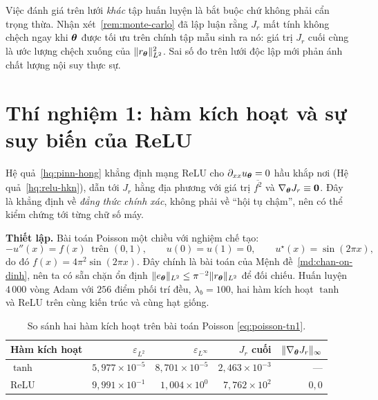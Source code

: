 Việc đánh giá trên lưới \emph{khác} tập huấn luyện là bắt buộc chứ không phải cẩn
trọng thừa. Nhận xét~\ref{rem:monte-carlo} đã lập luận rằng $J_r$ mất tính không
chệch ngay khi $\bm{\theta}$ được tối ưu trên chính tập mẫu sinh ra nó: giá trị $J_r$
cuối cùng là ước lượng chệch xuống của $\lVert r_{\bm{\theta}}\rVert^2_{L^2}$. Sai số đo
trên lưới độc lập mới phản ánh chất lượng nội suy thực sự.
 
\section{Thí nghiệm 1: hàm kích hoạt và sự suy biến của ReLU}
\label{sec:tn1}
 
\begin{thinghiem}
\label{tn:relu}
Hệ quả~\ref{hq:pinn-hong} khẳng định mạng ReLU cho
$\partial_{xx}u_{\bm{\theta}} = 0$ hầu khắp nơi
(Hệ quả~\ref{hq:relu-hkn}), dẫn tới $J_r$ hằng địa phương với giá trị
$\overline{f^2}$ và $\nabla_{\bm{\theta}}J_r \equiv \bm{0}$. Đây là khẳng định về
\emph{đẳng thức chính xác}, không phải về ``hội tụ chậm'', nên có thể kiểm chứng
tới từng chữ số máy.
\end{thinghiem}
 
\textbf{Thiết lập.} Bài toán Poisson một chiều với nghiệm chế tạo:
\begin{equation}
-u''(x) = f(x) \ \text{ trên } (0,1),
\qquad u(0) = u(1) = 0,
\qquad u^{\star}(x) = \sin(2\pi x),
\label{eq:poisson-tn1}
\end{equation}
do đó $f(x) = 4\pi^2\sin(2\pi x)$. Đây chính là bài toán của
Mệnh đề~\ref{md:chan-on-dinh}, nên ta có sẵn chặn ổn định
$\lVert e_{\bm{\theta}}\rVert_{L^2} \le \pi^{-2}\lVert r_{\bm{\theta}}\rVert_{L^2}$ để đối chiếu.
Huấn luyện $4\,000$ vòng Adam với $256$ điểm phối trí đều, $\lambda_b = 100$, hai
hàm kích hoạt $\tanh$ và ReLU trên cùng kiến trúc và cùng hạt giống.
 
\begin{table}[H]
\centering
\caption{So sánh hai hàm kích hoạt trên bài toán Poisson \eqref{eq:poisson-tn1}.}
\label{tab:tn1}
\small
\begin{tabular}{@{}lrrrr@{}}
\toprule
\textbf{Hàm kích hoạt} & $\varepsilon_{L^2}$ & $\varepsilon_{L^{\infty}}$
& $J_r$ cuối & $\lVert\nabla_{\bm{\theta}}J_r\rVert_{\infty}$ \\
\midrule
$\tanh$ & $5{,}977\times10^{-5}$ & $8{,}701\times10^{-5}$
        & $2{,}463\times10^{-3}$ & --- \\
ReLU    & $9{,}991\times10^{-1}$ & $1{,}004\times10^{0}$
        & $7{,}762\times10^{2}$  & $0{,}0$ \\
\bottomrule
\end{tabular}
\end{table}
 
